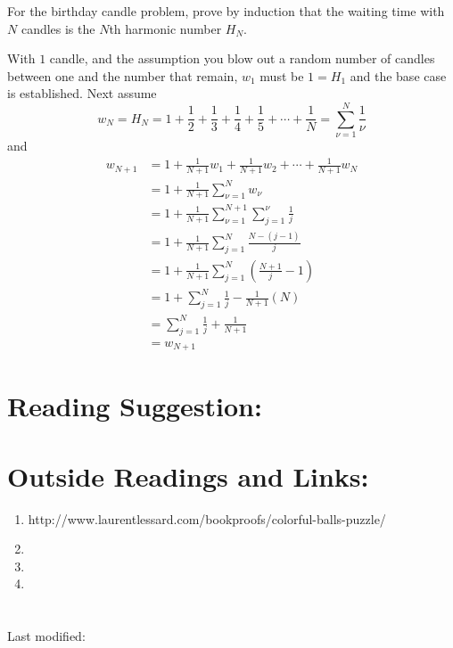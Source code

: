 \documentclass[12pt]{article}
\begin{document}
\begin{exercise}
    For the birthday candle problem, prove by induction that the waiting
    time with \( N \) candles is the \( N \)th harmonic number \( H_N \).
\end{exercise}
\begin{solution}
    With \( 1 \) candle, and the assumption you blow out a random number
    of candles between one and the number that remain, \( w_1 \) must be
    \( 1 = H_1 \) and the base case is established.  Next assume
    \[
        w_N = H_N = 1 + \frac{1}{2} + \frac{1}{3} + \frac{1}{4} + \frac{1}
        {5} + \cdots + \frac{1}{N} = \sum\limits_{\nu=1}^{N} \frac{1}{\nu}
    \] and
    \begin{align*}
        w_{N+1} &= 1 + \frac{1}{N+1} w_1 + \frac{1}{N+1} w_2 + \cdots +
        \frac{1}{N+1} w_N \\
        &= 1 + \frac{1}{N+1} \sum\limits_{\nu=1}^{N} w_{\nu} \\
        &= 1 + \frac{1}{N+1} \sum\limits_{\nu=1}^{N+1} \sum\limits_{j=1}^\nu
        \frac{1}{j} \\
        &= 1 + \frac{1}{N+1} \sum\limits_{j=1}^{N} \frac{N-(j-1)}{j} \\
        &= 1 + \frac{1}{N+1} \sum\limits_{j=1}^{N} \left( \frac{N+1} {j}
        - 1 \right) \\
        &= 1 + \sum\limits_{j=1}^{N} \frac{1}{j} -\frac{1}{N+1} (N) \\
        &= \sum\limits_{j=1}^{N} \frac{1}{j} + \frac{1}{N+1} \\
        &= w_{N+1}
    \end{align*}
\end{solution}
\hr

\section*{Reading Suggestion:}




\hr

\section*{Outside Readings and Links:}
\begin{enumerate}
    \item
        http://www.laurentlessard.com/bookproofs/colorful-balls-puzzle/
    \item
    \item
    \item
\end{enumerate}

\hr

\section*{\solutionsname} \loadSolutions

\mydisclaim \myfooter

Last modified:  \flastmod
\end{document}
